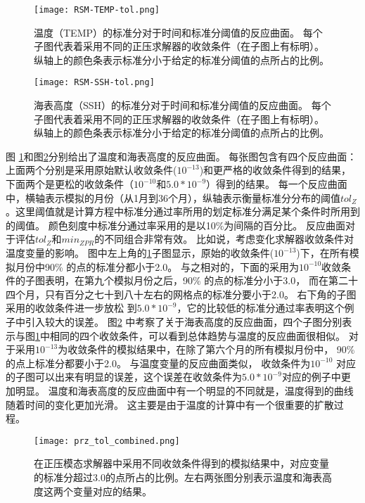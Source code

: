\begin {figure} 
\centering
\texttt{[image: RSM-TEMP-tol.png]}
\caption {温度（TEMP）的标准分对于时间和标准分阈值的反应曲面。 每个子图代表着采用不同的正压求解器的收敛条件（在子图上有标明）。纵轴上的颜色条表示标准分小于给定的标准分阈值的点所占的比例。}
\label{fig:RSM-TEMP-tol}
\end {figure}
 
\begin {figure} 
\centering
\texttt{[image: RSM-SSH-tol.png]}
\caption {海表高度（SSH）的标准分对于时间和标准分阈值的反应曲面。 每个子图代表着采用不同的正压求解器的收敛条件（在子图上有标明）。纵轴上的颜色条表示标准分小于给定的标准分阈值的点所占的比例。}
\label{fig:RSM-SSH-tol}
\end {figure}

图 \ref{fig:RSM-TEMP-tol}和图\ref{fig:RSM-SSH-tol}分别给出了温度和海表高度的反应曲面。 
每张图包含有四个反应曲面：上面两个分别是采用原始默认收敛条件($10^{-13}$)和更严格的收敛条件得到的结果，下面两个是更松的收敛条件（$10^{-10}$和$5.0*10^{-9}$）得到的结果。 
每一个反应曲面中，横轴表示模拟的月份（从1月到36个月），纵轴表示衡量标准分分布的阈值$tol_{Z}$。这里阈值就是计算方程中标准分通过率所用的划定标准分满足某个条件时所用到的阈值。
颜色刻度中标准分通过率采用的是以10\%为间隔的百分比。 
反应曲面对于评估$tol_{Z}$和$min_{ZPR}$的不同组合非常有效。
比如说，考虑变化求解器收敛条件对温度变量的影响。 
图中左上角的\ref{fig:RSM-TEMP-tol}子图显示，原始的收敛条件($10^{-13}$)下，在所有模拟月份中90\% 的点的标准分都小于2.0。
与之相对的，下面的采用为$10^{-10}$收敛条件的子图表明，在第九个模拟月份之后，90\% 的点的标准分小于3.0， 而在第二十四个月，只有百分之七十到八十左右的网格点的标准分要小于2.0。
右下角的子图采用的收敛条件进一步放松 到$5.0*10^{-9}$，它的比较低的标准分通过率表明这个例子中引入较大的误差。
图\ref{fig:RSM-SSH-tol} 中考察了关于海表高度的反应曲面，四个子图分别表示与图\ref{fig:RSM-TEMP-tol}中相同的四个收敛条件，可以看到总体趋势与温度的反应曲面很相似。 
对于采用$10^{-13}$为收敛条件的模拟结果中，在除了第六个月的所有模拟月份中， 90\%的点上标准分都要小于2.0。 
与温度变量的反应曲面类似， 收敛条件为$10^{-10}$ 对应的子图可以出来有明显的误差，这个误差在收敛条件为$5.0*10^{-9}$对应的例子中更加明显。 
温度和海表高度的反应曲面中有一个明显的不同就是，温度得到的曲线随着时间的变化更加光滑。 这主要是由于温度的计算中有一个很重要的扩散过程。

 

\begin{figure} 
\centering 
\texttt{[image: prz\_tol\_combined.png]}
\caption { 
  在正压模态求解器中采用不同收敛条件得到的模拟结果中，对应变量的标准分超过3.0的点所占的比例。左右两张图分别表示温度和海表高度这两个变量对应的结果。}
\label {fig:PRZ-tol}
\end{figure}

